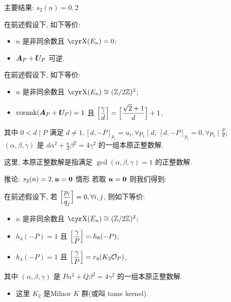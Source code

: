 \documentclass[aspectratio=169,handout]{ctexbeamer}
\renewcommand\aleg[2]{\Bigl[\dfrac{{#1}}{#2}\Bigr]}
\begin{document}
\begin{frame}{主要结果: $s_2(n)=0,2$}
  \begin{theorem}
    在前述假设下, 如下等价:
    \begin{itemize}[<*>]
      \item $n$ 是非同余数且 $\Sha(E_n)=0$;
      \item ${\boldsymbol{A}}_P+{\boldsymbol{U}}_P$ 可逆.
    \end{itemize}
  \end{theorem}
  \onslide<+->
  \begin{theorem}
    在前述假设下, 如下等价:
    \begin{itemize}[<*>]
      \item $n$ 是非同余数且 $\Sha(E_n)\cong(\BZ/2\BZ)^2$;
      \item $\operatorname{corank}({\boldsymbol{A}}_P+{\boldsymbol{U}}_P)=1$ 且 $\aleg{\gamma}d=\aleg{\sqrt2+1}{d}+1$,
    \end{itemize}
    其中 $0<d\mid P$ 满足 $d\ne 1, [d,-P]_{p_i}=u_i,\forall p_i\mid d$; $[d,-P]_{p_i}=0,\forall p_i\mid \frac Pd$;  $(\alpha,\beta,\gamma)$ 是 $d\alpha^2+\frac{n}d\beta^2=4\gamma^2$ 的一组本原正整数解.
  \end{theorem}
  \onslide<+->
  这里, 本原正整数解是指满足 $\gcd(\alpha,\beta,\gamma)=1$ 的正整数解.
\end{frame}


\begin{frame}{推论: $s_2(n)=2,{\boldsymbol{u}}={\bf0}$ 情形}
  若取 ${\boldsymbol{u}}={\bf0}$ 则我们得到:
  \begin{corollary}
    在前述假设下, 若 $\aleg{p_i}{q_j}=0, \forall i,j$, 则如下等价:
    \begin{itemize}[<*>]
      \item $n$ 是非同余数且 $\Sha(E_n)\cong(\BZ/2\BZ)^2$;
      \item $h_4(-P)=1$ 且 $\aleg{\gamma}P=h_8(-P)$;
      \item $h_4(-P)=1$ 且 $\aleg{\gamma}P=r_4(K_2\CO_P)$,
    \end{itemize}
    其中 $(\alpha,\beta,\gamma)$ 是 $P\alpha^2+Q\beta^2=4\gamma^2$ 的一组本原正整数解.
  \end{corollary}
  \begin{itemize}
    \item 这里 $K_2$ 是Milnor $K$ 群(或叫 tame kernel).
  \end{itemize}
\end{frame}
\end{document}
